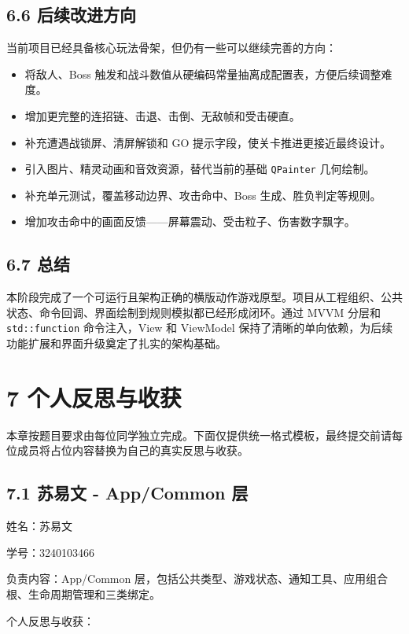 \documentclass[12pt,fontset=none]{ctexart}
\begin{document}
\subsection{6.6 后续改进方向}

当前项目已经具备核心玩法骨架，但仍有一些可以继续完善的方向：

\begin{itemize}
\item 将敌人、Boss 触发和战斗数值从硬编码常量抽离成配置表，方便后续调整难度。
\item 增加更完整的连招链、击退、击倒、无敌帧和受击硬直。
\item 补充遭遇战锁屏、清屏解锁和 GO 提示字段，使关卡推进更接近最终设计。
\item 引入图片、精灵动画和音效资源，替代当前的基础 \texttt{QPainter} 几何绘制。
\item 补充单元测试，覆盖移动边界、攻击命中、Boss 生成、胜负判定等规则。
\item 增加攻击命中的画面反馈——屏幕震动、受击粒子、伤害数字飘字。
\end{itemize}


\subsection{6.7 总结}

本阶段完成了一个可运行且架构正确的横版动作游戏原型。项目从工程组织、公共状态、命令回调、界面绘制到规则模拟都已经形成闭环。通过 MVVM 分层和 \texttt{std::function} 命令注入，View 和 ViewModel 保持了清晰的单向依赖，为后续功能扩展和界面升级奠定了扎实的架构基础。


\section{7 个人反思与收获}

本章按题目要求由每位同学独立完成。下面仅提供统一格式模板，最终提交前请每位成员将占位内容替换为自己的真实反思与收获。

\subsection{7.1 苏易文 - App/Common 层}

姓名：苏易文

学号：3240103466

负责内容：App/Common 层，包括公共类型、游戏状态、通知工具、应用组合根、生命周期管理和三类绑定。

个人反思与收获：
\end{document}
